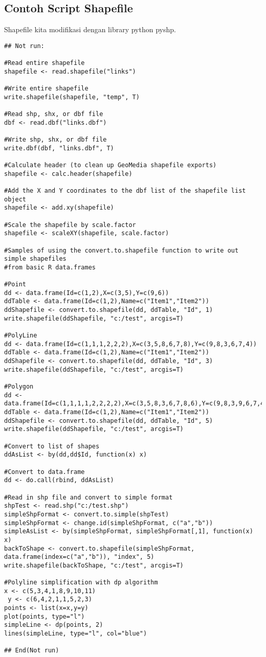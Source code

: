 \subsection{Contoh Script Shapefile}
Shapefile kita modifikasi dengan library python pyshp\cite{stabler2006shapefiles}.
\begin{lstlisting}
## Not run: 

#Read entire shapefile 
shapefile <- read.shapefile("links") 

#Write entire shapefile 
write.shapefile(shapefile, "temp", T) 

#Read shp, shx, or dbf file 
dbf <- read.dbf("links.dbf") 

#Write shp, shx, or dbf file 
write.dbf(dbf, "links.dbf", T) 

#Calculate header (to clean up GeoMedia shapefile exports) 
shapefile <- calc.header(shapefile) 

#Add the X and Y coordinates to the dbf list of the shapefile list object 
shapefile <- add.xy(shapefile)

#Scale the shapefile by scale.factor 
shapefile <- scaleXY(shapefile, scale.factor) 

#Samples of using the convert.to.shapefile function to write out simple shapefiles 
#from basic R data.frames 

#Point 
dd <- data.frame(Id=c(1,2),X=c(3,5),Y=c(9,6)) 
ddTable <- data.frame(Id=c(1,2),Name=c("Item1","Item2")) 
ddShapefile <- convert.to.shapefile(dd, ddTable, "Id", 1) 
write.shapefile(ddShapefile, "c:/test", arcgis=T) 

#PolyLine 
dd <- data.frame(Id=c(1,1,1,2,2,2),X=c(3,5,8,6,7,8),Y=c(9,8,3,6,7,4)) 
ddTable <- data.frame(Id=c(1,2),Name=c("Item1","Item2")) 
ddShapefile <- convert.to.shapefile(dd, ddTable, "Id", 3) 
write.shapefile(ddShapefile, "c:/test", arcgis=T) 

#Polygon 
dd <- data.frame(Id=c(1,1,1,1,2,2,2,2),X=c(3,5,8,3,6,7,8,6),Y=c(9,8,3,9,6,7,4,6)) 
ddTable <- data.frame(Id=c(1,2),Name=c("Item1","Item2")) 
ddShapefile <- convert.to.shapefile(dd, ddTable, "Id", 5) 
write.shapefile(ddShapefile, "c:/test", arcgis=T)

#Convert to list of shapes 
ddAsList <- by(dd,dd$Id, function(x) x) 

#Convert to data.frame 
dd <- do.call(rbind, ddAsList) 

#Read in shp file and convert to simple format 
shpTest <- read.shp("c:/test.shp") 
simpleShpFormat <- convert.to.simple(shpTest) 
simpleShpFormat <- change.id(simpleShpFormat, c("a","b")) 
simpleAsList <- by(simpleShpFormat, simpleShpFormat[,1], function(x) x) 
backToShape <- convert.to.shapefile(simpleShpFormat, 
data.frame(index=c("a","b")), "index", 5) 
write.shapefile(backToShape, "c:/test", arcgis=T) 

#Polyline simplification with dp algorithm 
x <- c(5,3,4,1,8,9,10,11)
 y <- c(6,4,2,1,1,5,2,3) 
points <- list(x=x,y=y) 
plot(points, type="l") 
simpleLine <- dp(points, 2) 
lines(simpleLine, type="l", col="blue") 

## End(Not run) 
\end{lstlisting}


